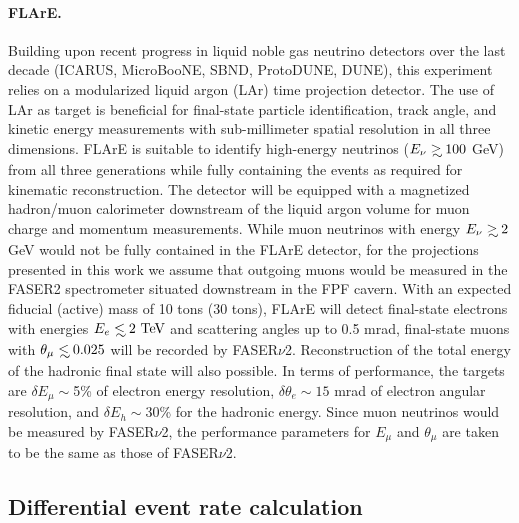  \paragraph{FLArE.}
 Building upon recent progress in liquid noble gas neutrino detectors over the last decade (ICARUS, MicroBooNE, SBND, ProtoDUNE, DUNE), this experiment relies on a modularized liquid argon (LAr) time projection detector.
 The use of LAr as target is beneficial for final-state particle identification, track angle, and kinetic energy measurements with sub-millimeter spatial resolution in all three dimensions.
 FLArE is suitable to identify high-energy neutrinos ($E_\nu \gsim 100$ GeV)  from all three generations
 while  fully containing the events as required for kinematic reconstruction.
 The detector will be equipped with a magnetized hadron/muon calorimeter downstream of the liquid argon volume
 for muon charge and momentum measurements.
 While muon neutrinos with energy $E_\nu \gsim 2$ GeV would not be fully
 contained in the  FLArE detector,
for the projections presented in this work
 we assume that outgoing muons would be measured in the FASER2 spectrometer
  situated downstream in the FPF cavern.
 With an expected fiducial (active) mass of 10 tons (30 tons), FLArE will
 detect final-state electrons with energies $E_{e}\lsim 2~\rm{TeV}$ and
 scattering angles up to 0.5 mrad,  final-state muons
 with $\theta_\mu \lsim 0.025$ will be recorded by FASER$\nu$2.
 Reconstruction of the total energy of the hadronic final state will also
 possible. 
 In terms of performance, the targets
 are $\delta E_\mu \sim$5\% of electron energy resolution,
 $\delta \theta_e \sim 15$ mrad of electron angular  resolution,
 and $\delta E_h \sim 30$\% for the hadronic energy.
 Since muon neutrinos would be measured by FASER$\nu$2, the
 performance parameters for $E_\mu$ and $\theta_\mu$ are  taken
 to be the same as those of FASER$\nu$2.

\subsection{Differential event rate calculation}
\label{sec:pseudo-data_generation}

